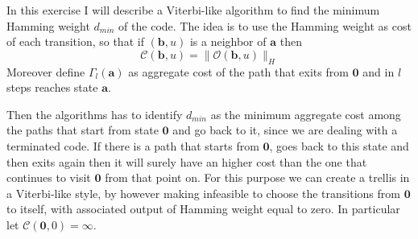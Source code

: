 \documentclass[10pt]{article}
\newcommand{\outf}[1] {\mathcal{O}(#1)}
\begin{document}
In this exercise I will describe a Viterbi-like algorithm to find the minimum Hamming weight $d_{min}$ of the code. The idea is to use the Hamming weight as cost of each transition, so that if $(\mathbf{b}, u)$ is a neighbor of $\mathbf{a}$ then
\begin{equation}
	\mathcal{C}(\mathbf{b}, u) = \|\outf{\mathbf{b}, u}\|_H
\end{equation}
Moreover define $\Gamma_l(\mathbf{a})$ as aggregate cost of the path that exits from $\mathbf{0}$ and in $l$ steps reaches state $\mathbf{a}$.

Then the algorithms has to identify $d_{min}$ as the minimum aggregate cost among the paths that start from state $\mathbf{0}$ and go back to it, since we are dealing with a terminated code. If there is a path that starts from $\mathbf{0}$, goes back to this state and then exits again then it will surely have an higher cost than the one that continues to visit $\mathbf{0}$ from that point on. For this purpose we can create a trellis in a Viterbi-like style, by however making infeasible to choose the transitions from $\mathbf{0}$ to itself, with associated output of Hamming weight equal to zero. In particular let $\mathcal{C}(\mathbf{0}, 0) = \infty$.

\end{document}

